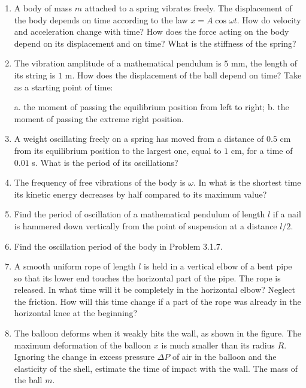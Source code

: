 \documentclass{article}
\begin{document}
\begin{enumerate}[label=3.3.\arabic*]

\item A body of mass $m$ attached to a spring vibrates freely. The displacement of the body depends on time according to the law $x = A \cos{\omega t}$. How do velocity and acceleration change with time? How does the force acting on the body depend on its displacement and on time? What is the stiffness of the spring?

\item The vibration amplitude of a mathematical pendulum is $5$ mm, the length of its string is $1$ m. How does the displacement of the ball depend on time? Take as a starting point of time: 

a. the moment of passing the equilibrium position from left to right; 
b. the moment of passing the extreme right position.

\item A weight oscillating freely on a spring has moved from a distance of $0.5$ cm from its equilibrium position to the largest one, equal to $1$ cm, for a time of $0.01$ s. What is the period of its oscillations?

\item The frequency of free vibrations of the body is $\omega$. In what is the shortest time its kinetic energy decreases by half compared to its maximum value?

\item Find the period of oscillation of a mathematical pendulum of length $l$ if a nail is hammered down vertically from the point of suspension at a distance $l/2$.

\item Find the oscillation period of the body in Problem 3.1.7.

\item A smooth uniform rope of length $l$ is held in a vertical elbow of a bent pipe so that its lower end touches the horizontal part of the pipe. The rope is released. In what time will it be completely in the horizontal elbow? Neglect the friction. How will this time change if a part of the rope was already in the horizontal knee at the beginning?

\item The balloon deforms when it weakly hits the wall, as shown in the figure. The maximum deformation of the balloon $x$ is much smaller than its radius $R$. Ignoring the change in excess pressure $\Delta P$ of air in the balloon and the elasticity of the shell, estimate the time of impact with the wall. The mass of the ball $m$.


\end{enumerate}
\end{document}
